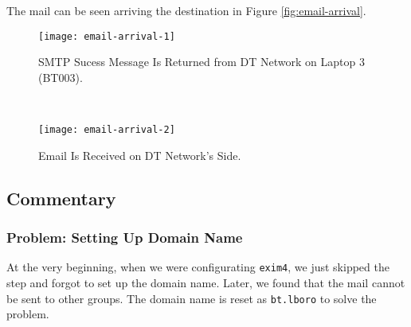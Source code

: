 The mail can be seen arriving the destination in Figure \ref{fig:email-arrival}.

\begin{figure*}[ht!]
    \centering
    \begin{subfigure}[b]{\textwidth}
        \centering
        \texttt{[image: email-arrival-1]}
        \caption{SMTP Sucess Message Is Returned from DT Network on Laptop 3 (BT003).}
    \end{subfigure}
    ~
    \begin{subfigure}[b]{\textwidth}
        \centering
        \texttt{[image: email-arrival-2]}
        \caption{Email Is Received on DT Network's Side.}
    \end{subfigure}
    \caption{Email Can Be Seen Arrived on Both Sides.}
    \label{fig:email-arrival}
\end{figure*}

\subsection{Commentary}

\subsubsection{Problem: Setting Up Domain Name}
At the very beginning, when we were configurating \texttt{exim4}, we just skipped the step and forgot to set up the domain name. 
Later, we found that the mail cannot be sent to other groups. 
The domain name is reset as \texttt{bt.lboro} to solve the problem.











